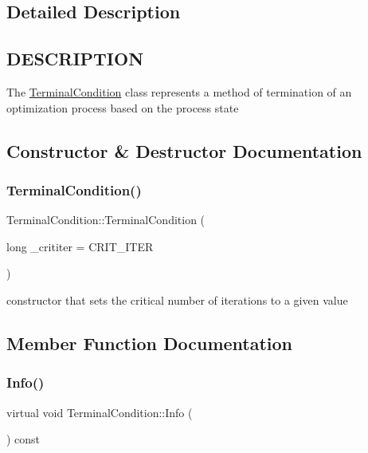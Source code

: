 \subsection{Detailed Description}
\hypertarget{function_8h_DESCRIPTION}{}\subsection{D\+E\+S\+C\+R\+I\+P\+T\+I\+ON}\label{function_8h_DESCRIPTION}
The \hyperlink{class_terminal_condition}{Terminal\+Condition} class represents a method of termination of an optimization process based on the process state 

\subsection{Constructor \& Destructor Documentation}
\mbox{\label{class_terminal_condition_a4c95c14f8dd8e7b5d6e625ff438f53d3}} 
\subsubsection{\texorpdfstring{Terminal\+Condition()}{TerminalCondition()}}
{\footnotesize\ttfamily Terminal\+Condition\+::\+Terminal\+Condition (\begin{DoxyParamCaption}\item[{long}]{\+\_\+crititer = {\ttfamily CRIT\+\_\+ITER} }\end{DoxyParamCaption})}

constructor that sets the critical number of iterations to a given value 

\subsection{Member Function Documentation}
\mbox{\label{class_terminal_condition_a55f2460a4776875211b0a4c3b449b40f}} 
\subsubsection{\texorpdfstring{Info()}{Info()}}
{\footnotesize\ttfamily virtual void Terminal\+Condition\+::\+Info (\begin{DoxyParamCaption}{ }\end{DoxyParamCaption}) const\hspace{0.3cm}{\ttfamily [pure virtual]}}

